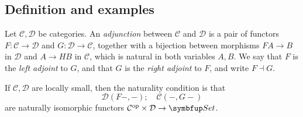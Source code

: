 \subsection{Definition and examples}
\begin{definition}
    Let \( \mathcal C, \mathcal D \) be categories.
    An \emph{adjunction} between \( \mathcal C \) and \( \mathcal D \) is a pair of functors \( F : \mathcal C \to \mathcal D \) and \( G : \mathcal D \to \mathcal C \), together with a bijection between morphisms \( FA \to B \) in \( \mathcal D \) and \( A \to HB \) in \( \mathcal C \), which is natural in both variables \( A, B \).
    We say that \( F \) is the \emph{left adjoint} to \( G \), and that \( G \) is the \emph{right adjoint} to \( F \), and write \( F \dashv G \).
\end{definition}
If \( \mathcal C, \mathcal D \) are locally small, then the naturality condition is that
\[ \mathcal D(F-, -);\quad \mathcal C(-, G-) \]
are naturally isomorphic functors \( \mathcal C^\cop \times \mathcal D \to \mathbf{Set} \).
